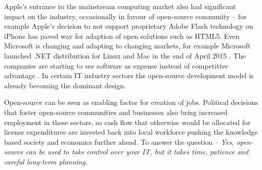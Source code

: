 \documentclass{article}
\begin{document}
Apple's entrance to the mainstream computing market
also had significant impact on the industry,
occasionally in favour of open-source community --
for example Apple's decision to not support
proprietary Adobe Flash technology on iPhone
\cite{apple-pretty-much-murdered-mobile-flash}
has paved way for adaption of open solutions such as HTML5.
Even Microsoft is changing and adapting to changing markets,
for example Microsoft launched .NET distribution for
Linux and Mac in the end of April 2015
\cite{microsoft-launches-net-distribution-for-linux}.
The companies are starting to see
software as expense instead of competitive advantage
\cite{eesti-telekom-annab-arisektorile-suunatud-tarkvara-vabakasutusse}.
In certain IT industry sectors the open-source
development model is already becoming the dominant design.

Open-source can be seen as enabling factor for creation of jobs.
Political decisions that foster open-source communities and businesses
also bring increased employment in these sectors,
so cash flow that otherwise would be allocated for
license expenditures
are invested back into local workforce
pushing the knowledge based society and economics further ahead.
To answer the question -- \emph{Yes, open-source can be used
to take control over your IT, but it takes time, patience and
careful long-term planning}.




\appendix

\clearpage



\end{document}
